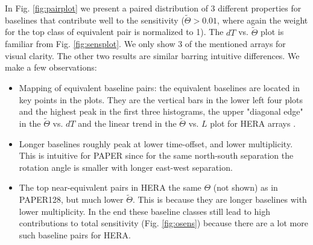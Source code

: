 \documentclass[twocolumn,apj,numberedappendix]{emulateapj}
\renewcommand\[{\begin{equation}}
\renewcommand\]{\end{equation}}
\begin{document}
In Fig. \ref{fig:pairplot} we present a paired distribution of 3 different properties for baselines that contribute well to the sensitivity ($\widetilde{\Theta}>0.01$, where again the weight for the top class of equivalent pair is normalized to 1). The $dT$ vs. $\widetilde{\Theta}$ plot is familiar from Fig. \ref{fig:sensplot}. We only show 3 of the mentioned arrays for visual clarity. The other two results are similar barring intuitive differences. We make a few observations:
\begin{itemize}

\item Mapping of equivalent baseline pairs: the equivalent baselines are located in key points in the plots. They are the vertical bars in the lower left four plots and the highest peak in the first three histograms, the upper "diagonal edge" in the $\widetilde{\Theta}$ vs. $dT$ and the linear trend in the $\widetilde{\Theta}$ vs. $L$ plot for HERA arrays . 


\item Longer baselines roughly peak at lower time-offset, and lower multiplicity. This is intuitive for PAPER since  for the same north-south separation the rotation angle is smaller with longer east-west separation. 

\item The top near-equivalent pairs in HERA the same $\Theta$ (not shown) as in PAPER128, but much lower $\widetilde{\Theta}$. This is because they are longer baselines with lower multiplicity. In the end these baseline classes still lead to high contributions to total sensitivity (Fig. \ref{fig:osens}) because there are a lot more such baseline pairs for HERA.  

\end{itemize}
\end{document}
